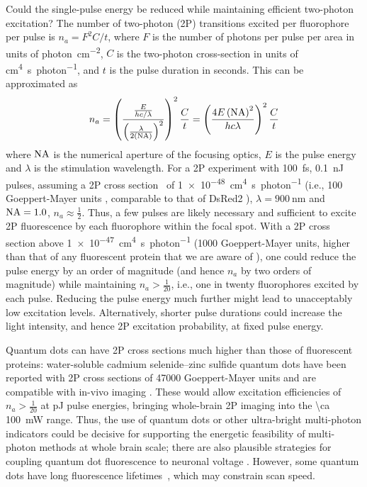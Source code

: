 Could the single-pulse energy be reduced while maintaining efficient two-photon excitation? The number of two-photon (2P) transitions excited per fluorophore per pulse is $n_a = F^2 C / t$, where $F$ is the number of photons per pulse per area in units of \si{photon\per\centi\meter\squared}, $C$ is the two-photon cross-section in units of \si{\centi\meter\tothe{4}\second\per photon}, and $t$ is the pulse duration in seconds.
This can be approximated as
\[n_a = \left(\frac{\frac{E}{h c / \lambda}}{\left(\frac{\lambda}{2 \left(\text{NA}\right)}\right)^2}\right)^2 \frac{C}{t} = \left(\frac{4E\left(\text{NA}\right)^2}{h c \lambda}\right)^2 \frac{C}{t}\]
where $\text{NA}$ is the numerical aperture of the focusing optics, $E$ is the pulse energy and $\lambda$ is the stimulation wavelength.
For a 2P experiment with \SI{100}{\femto\second}, \SI{0.1}{\nano\joule} pulses, assuming a 2P cross section~\cite{masters06, drobizhev2011} of \SI{1e-48}{\centi\meter\tothe{4}\second\per photon} (i.e., 100 Goeppert-Mayer units \cite{Goeppert-Mayer1931}, comparable to that of DsRed2 \cite{drobizhev2011}), $\lambda=\SI{900}{\nano\meter}$ and $\text{NA}=1.0$, $n_a \approx \frac{1}{2}$.
Thus, a few pulses are likely necessary and sufficient to excite 2P fluorescence by each fluorophore within the focal spot. With a 2P cross section above \SI{1e-47}{\centi\meter\tothe{4}\second\per photon} (1000 Goeppert-Mayer units, higher than that of any fluorescent protein that we are aware of \cite{drobizhev2011}), one could reduce the pulse energy by an order of magnitude (and hence $n_a$ by two orders of magnitude) while maintaining $n_a > \frac{1}{20}$, i.e., one in twenty fluorophores excited by each pulse. Reducing the pulse energy much further might lead to unacceptably low excitation levels. Alternatively, shorter pulse durations could increase the light intensity, and hence 2P excitation probability, at fixed pulse energy. 

Quantum dots can have 2P cross sections much higher than those of fluorescent proteins:  water-soluble cadmium selenide–zinc sulfide quantum dots have been reported with 2P cross sections of 47000 Goeppert-Mayer units and are compatible with in-vivo imaging \cite{Larson30052003}. These would allow excitation efficiencies of $n_a > \frac{1}{20}$ at \si{\pico\joule} pulse energies, bringing whole-brain 2P imaging into the \SI{\ca 100}{\milli\watt} range. Thus, the use of quantum dots or other ultra-bright multi-photon indicators could be decisive for supporting the energetic feasibility of multi-photon methods at whole brain scale; there are also plausible strategies for coupling quantum dot fluorescence to neuronal voltage \cite{Marshall2013}. However, some quantum dots have long fluorescence lifetimes~\cite{Dahan2001}, which may constrain scan speed.


